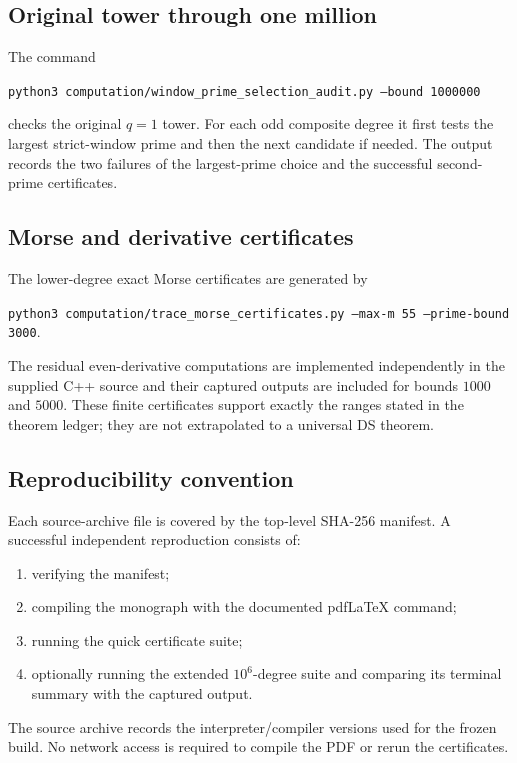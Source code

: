 \documentclass[11pt]{article}
\theoremstyle{keio}
\theoremstyle{definition}
\theoremstyle{remark}
\begin{document}
\subsection{Original tower through one million}

The command
\begin{center}
\texttt{python3 computation/window\_prime\_selection\_audit.py
  --bound 1000000}
\end{center}
checks the original \(q=1\) tower.  For each odd composite degree it first
tests the largest strict-window prime and then the next candidate if needed.
The output records the two failures of the largest-prime choice and the
successful second-prime certificates.

\subsection{Morse and derivative certificates}

The lower-degree exact Morse certificates are generated by
\begin{center}
\texttt{python3 computation/trace\_morse\_certificates.py
  --max-m 55 --prime-bound 3000}.
\end{center}
The residual even-derivative computations are implemented independently in
the supplied C++ source and their captured outputs are included for bounds
\(1000\) and \(5000\).  These finite certificates support exactly the ranges
stated in the theorem ledger; they are not extrapolated to a universal DS
theorem.

\subsection{Reproducibility convention}

Each source-archive file is covered by the top-level SHA-256 manifest.  A
successful independent reproduction consists of:

\begin{enumerate}
\item verifying the manifest;
\item compiling the monograph with the documented pdfLaTeX command;
\item running the quick certificate suite;
\item optionally running the extended \(10^6\)-degree suite and comparing
its terminal summary with the captured output.
\end{enumerate}

The source archive records the interpreter/compiler versions used for the
frozen build.  No network access is required to compile the PDF or rerun the
certificates.
\end{document}
